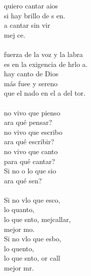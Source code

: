 \begin{cancion}%
	quiero cantar aios  \\
	si  hay brillo de s en.  \\
	a cantar sin vir  \\
	mej  ce. \\
\jump\\
	fuerza de la voz y la labra  \\
	es en la exigencia de hrlo a. \\
	hay canto de Dios \\
	más fuee y sereno\\
	que el nado en el a del tor. \\
\jump\\
	no vivo que pienso\\
	ara qué pensar? \\
	no vivo que escribo \\
	ara qué escribir? \\
	no vivo que canto\\
	para qué cantar?\\
	Si no o lo que sio \\
	ara qué sen?\\
\jump\\
	Si no vlo que esco,\\
	lo quanto,  \\
	lo que snto, mejcallar,\\
	mejor mo.\\
	Si no vlo que esbo, \\
	lo quento,  \\
	lo que snto, or call\\
	mejor mr. \\
\end{cancion}%
